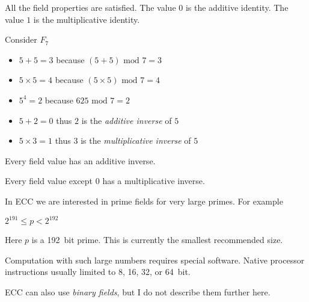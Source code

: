 \documentclass[landscape]{slides}
\begin{document}
All the field properties are satisfied. The value $0$ is the additive identity. The value $1$ is
the multiplicative identity.

\stopslide



Consider $F_7$

\begin{itemize}
\item $5 + 5 = 3$ because $(5 + 5)\,\, \textrm{mod}\,\, 7 = 3$
\item $5 \times 5 = 4$ because $(5 \times 5)\,\, \textrm{mod}\,\, 7 = 4$
\item $5^4 = 2$ because $625\,\, \textrm{mod}\,\, 7 = 2$
\item $5 + 2 = 0$ thus $2$ is the \textit{additive inverse} of $5$
\item $5 \times 3 = 1$ thus $3$ is the \textit{multiplicative inverse} of $5$
\end{itemize}

Every field value has an additive inverse.

Every field value except $0$ has a multiplicative inverse.

\stopslide



In ECC we are interested in prime fields for very large primes. For example

$2^{191} \le p < 2^{192}$

Here $p$ is a 192~bit prime. This is currently the smallest recommended size.

Computation with such large numbers requires special software. Native processor instructions
usually limited to 8, 16, 32, or 64~bit.

ECC can also use \textit{binary fields}, but I do not describe them further here.

\stopslide
\end{document}
